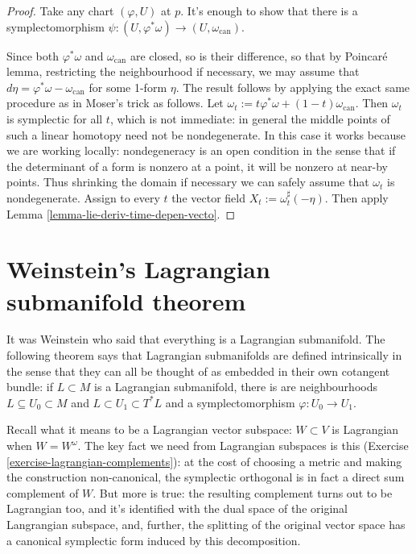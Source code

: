 \begin{proof}
Take any chart $(\varphi,U)$ at $p$.
It's enough to show that there is a
symplectomorphism
$\psi:(U,\varphi^*\omega)\to(U,
\omega_{\text{can}})$.

Since both $\varphi^*\omega$ and
$\omega_{\text{can}}$
are closed, so is their difference,
so that by Poincaré lemma, restricting the
neighbourhood if necessary,
we may assume that
$d\eta=\varphi^*\omega-\omega_{\text{can}}$
for some 1-form $\eta$.
The result follows by applying the exact same
procedure as in
Moser's trick as follows.
Let $\omega_t:=t
\varphi^*\omega+(1-t)\omega_{\text{can}}$.
Then $\omega_t$ is symplectic for all $t$,
which is not immediate:
in general the middle points of such 
a linear homotopy need not be nondegenerate.
In this case it works because we are working
locally: nondegeneracy is an open condition
in the sense that if the determinant
of a form is nonzero at a point,
it will be nonzero at near-by points.
Thus shrinking the domain if necessary
we can safely assume that $\omega_t$ is
nondegenerate.
Assign to every $t$ the vector field
$X_t:=\omega_t^\sharp(-\eta)$.
Then apply Lemma
\ref{lemma-lie-deriv-time-depen-vecto}.
\end{proof}

\section{Weinstein's Lagrangian submanifold
theorem}
\label{section-weins-lagra-subma}

\noindent
It was Weinstein who said that everything is
a Lagrangian submanifold.
The following theorem says that Lagrangian
submanifolds are
defined intrinsically in the sense that they
can all
be thought of as embedded in their own
cotangent bundle:
if $L \subset M$ is a Lagrangian submanifold,
there is are neighbourhoods $L \subseteq U_0
\subset M$
and $L \subset U_1 \subset T^*L$
and a symplectomorphism $\varphi:U_0 \to
U_1$.

Recall what it means to be a Lagrangian
vector subspace: $W \subset V$ is 
Lagrangian when $W = W^\omega$.
The key fact we need from
Lagrangian subspaces is this
(Exercise 
\ref{exercise-lagrangian-complements}):
at the cost of choosing a metric
and making the construction non-canonical,
the symplectic orthogonal is in fact
a direct sum complement of $W$.
But more is true: the resulting
complement turns out to be Lagrangian too,
and it's identified with the dual space
of the original Langrangian subspace,
and, further, the splitting of the
original vector space has a canonical
symplectic form induced by this
decomposition. 

